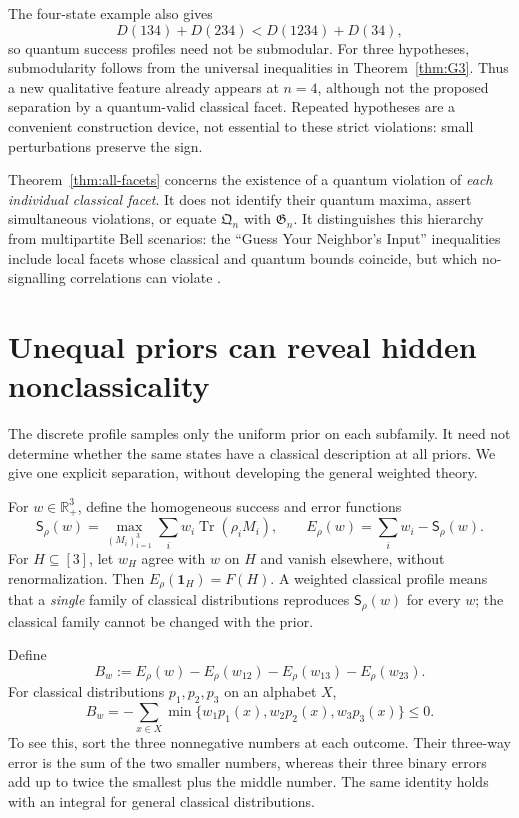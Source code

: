 \documentclass[10pt,a4paper]{amsart}
\newcommand{\Tr}{\operatorname{Tr}}
\newcommand{\R}{\mathbb R}
\newcommand{\1}{\mathbf 1}
\newcommand{\Qreg}{\mathfrak Q}
\newcommand{\Greg}{\mathfrak G}
\newcommand{\Sopt}{\mathsf S}
\begin{document}
The four-state example also gives
\begin{equation}\label{eq:submodularity-failure}
 D(134)+D(234)<D(1234)+D(34),
\end{equation}
so quantum success profiles need not be submodular. For three hypotheses,
submodularity follows from the universal inequalities in
Theorem~\ref{thm:G3}. Thus a new qualitative feature already appears at
$n=4$, although not the proposed separation by a quantum-valid classical
facet. Repeated hypotheses are a convenient construction device, not essential
to these strict violations: small perturbations preserve the sign.

Theorem~\ref{thm:all-facets} concerns the existence of a quantum violation of
\emph{each individual classical facet}. It does not identify their quantum
maxima, assert simultaneous violations, or equate $\Qreg_n$ with $\Greg_n$.
It distinguishes this hierarchy from multipartite Bell scenarios: the
``Guess Your Neighbor's Input'' inequalities include local facets whose
classical and quantum bounds coincide, but which no-signalling correlations
can violate \cite{AlmeidaEtAl2010}.

\section{Unequal priors can reveal hidden nonclassicality}\label{sec:weighted}

The discrete profile samples only the uniform prior on each subfamily. It need
not determine whether the same states have a classical description at all
priors. We give one explicit separation, without developing the general
weighted theory.

For $w\in\R_+^3$, define the homogeneous success and error functions
\begin{equation}\label{eq:weighted-def}
 \Sopt_\rho(w)=\max_{(M_i)_{i=1}^3}\sum_iw_i\Tr(\rho_iM_i),
 \qquad E_\rho(w)=\sum_iw_i-\Sopt_\rho(w).
\end{equation}
For $H\subseteq[3]$, let $w_H$ agree with $w$ on $H$ and vanish elsewhere,
without renormalization. Then $E_\rho(\1_H)=F(H)$. A weighted classical
profile means that a \emph{single} family of classical distributions reproduces
$\Sopt_\rho(w)$ for every $w$; the classical family cannot be changed with the
prior.

Define
\begin{equation}\label{eq:weighted-beta}
 B_w:=E_\rho(w)-E_\rho(w_{12})-E_\rho(w_{13})-E_\rho(w_{23}).
\end{equation}
For classical distributions $p_1,p_2,p_3$ on an alphabet $X$,
\begin{equation}\label{eq:weighted-classical}
 B_w=-\sum_{x\in X}\min\{w_1p_1(x),w_2p_2(x),w_3p_3(x)\}\le0.
\end{equation}
To see this, sort the three nonnegative numbers at each outcome. Their
three-way error is the sum of the two smaller numbers, whereas their three
binary errors add up to twice the smallest plus the middle number.
The same identity holds with an integral for general classical distributions.
\end{document}
